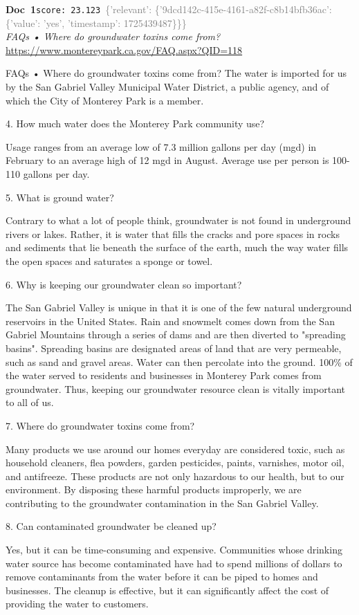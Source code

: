 \documentclass[a4paper,11pt]{article}
\begin{document}
\begin{docenv}
{\footnotesize\textcolor{doccolor}{\textbf{Doc~1}}}\hfill{\tiny\texttt{score:~23.123}}\ {\tiny\textcolor{gray}{\{'relevant': \{'9dcd142c-415e-4161-a82f-c8b14bfb36ac': \{'value': 'yes', 'timestamp': 1725439487\}\}\}}}\\[3pt]
{\small\textit{FAQs • Where do groundwater toxins come from?}}\\[2pt]
{\tiny\url{https://www.montereypark.ca.gov/FAQ.aspx?QID=118}}\\[4pt]
{\footnotesize FAQs • Where do groundwater toxins come from?
The water is imported for us by the San Gabriel Valley Municipal Water District, a public agency, and of which the City of Monterey Park is a member.	

4.
How much water does the Monterey Park community use?

Usage ranges from an average low of 7.3 million gallons per day (mgd) in February to an average high of 12 mgd in August. Average use per person is 100-110 gallons per day.	

5.
What is ground water?

Contrary to what a lot of people think, groundwater is not found in underground rivers or lakes. Rather, it is water that fills the cracks and pore spaces in rocks and sediments that lie beneath the surface of the earth, much the way water fills the open spaces and saturates a sponge or towel. 	

6.
Why is keeping our groundwater clean so important?

The San Gabriel Valley is unique in that it is one of the few natural underground reservoirs in the United States. Rain and snowmelt comes down from the San Gabriel Mountains through a series of dams and are then diverted to "spreading basins". Spreading basins are designated areas of land that are very permeable, such as sand and gravel areas. Water can then percolate into the ground. 100\% of the water served to residents and businesses in Monterey Park comes from groundwater. Thus, keeping our groundwater resource clean is vitally important to all of us. 	

7.
Where do groundwater toxins come from?

Many products we use around our homes everyday are considered toxic, such as household cleaners, flea powders, garden pesticides, paints, varnishes, motor oil, and antifreeze. These products are not only hazardous to our health, but to our environment. By disposing these harmful products improperly, we are contributing to the groundwater contamination in the San Gabriel Valley.	

8.
Can contaminated groundwater be cleaned up?

Yes, but it can be time-consuming and expensive. Communities whose drinking water source has become contaminated have had to spend millions of dollars to remove contaminants from the water before it can be piped to homes and businesses. The cleanup is effective, but it can significantly affect the cost of providing the water to customers.}
\end{docenv}
\end{document}
